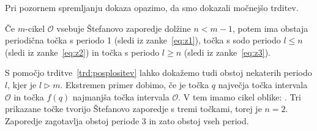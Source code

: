 \documentclass[mat2]{fmfdelo}
\begin{document}
Pri pozornem spremljanju dokaza opazimo, da smo dokazali močnejšo trditev.

\begin{trditev}\label{trd:posplositev}
Če $m$-cikel $\mathcal{O}$ vsebuje Štefanovo zaporedje dolžine $n<m-1$, potem ima obstaja periodična točka s periodo 1 (sledi iz zanke~\ref{eq:z1}), točka s sodo periodo $l \leq n$ (sledi iz zanke~\ref{eq:z2}) in točka s periodo $l \geq n$ (sledi iz zanke~\ref{eq:z3}).
\end{trditev}

S pomočjo trditve~\ref{trd:posplositev} lahko dokažemo tudi obstoj nekaterih periodo $l$, kjer je $l \triangleright m$. 
Ekstremen primer dobimo, če je točka $q$ največja točka intervala $\mathcal{O}$ in točka $f(q)$ najmanjša točka intervala $\mathcal{O}$.  V tem imamo cikel oblike:
.
Tri prikazane točke tvorijo Štefanovo zaporedje s tremi točkami, torej je $n=2$. Zaporedje zagotavlja obstoj periode 3 in zato obstoj vseh period.



\end{document}
